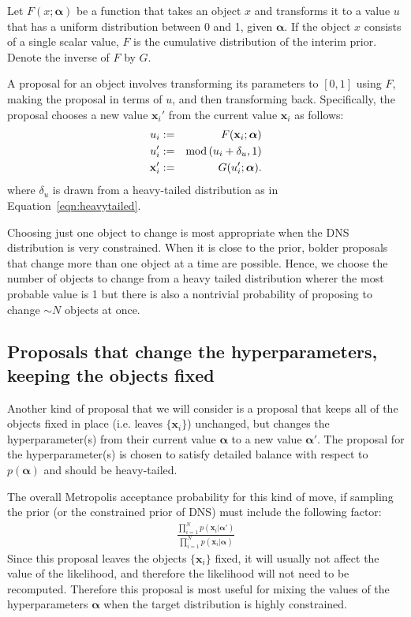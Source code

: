 \documentclass[letterpaper, 11pt]{article}
\newcommand{\hyperparams}{\boldsymbol{\alpha}}
\newcommand{\xx}{\mathbf{x}}
\begin{document}
Let $F(x; \hyperparams)$ be a function that takes an object $x$ and transforms it
to a value $u$ that has a uniform distribution between 0 and 1, given $\hyperparams$.
If the object $x$ consists of a single scalar value, $F$ is the cumulative
distribution of the interim prior. Denote the inverse of $F$ by $G$.

A proposal
for an object involves transforming its parameters to $[0, 1]$ using $F$,
making the proposal in terms of $u$, and then transforming back.
Specifically, the proposal chooses
a new value $\xx_i'$ from the current value $\xx_i$ as follows:
\begin{eqnarray}
u_i &:=& F(\xx_i; \hyperparams)\\
u_i' &:=& \textnormal{mod}\left(u_i + \delta_u, 1\right)\\
\xx_i' &:=& G(u_i'; \hyperparams).
\end{eqnarray}
where $\delta_u$ is drawn from a heavy-tailed distribution as in
Equation~\ref{eqn:heavytailed}.

Choosing just one object to change is most appropriate when the DNS
distribution is very constrained. When it is close to the prior, bolder
proposals that change more than one object at a time are possible. Hence,
we choose the number of objects to change from a heavy tailed distribution
wherer the most probable value is 1 but there is also a nontrivial probability
of proposing to change $\sim N$ objects at once.

\subsection{Proposals that change the hyperparameters,
keeping the objects fixed}\label{sec:proposal3}
Another kind of proposal that we will consider is a proposal that keeps all of
the objects fixed in place (i.e. leaves $\{\xx_i\}$) unchanged, but changes
the hyperparameter(s) from their current value $\hyperparams$
to a new value $\hyperparams'$. The proposal for the hyperparameter(s) is chosen
to satisfy detailed balance with respect to $p(\hyperparams)$ and should be
heavy-tailed.

The overall Metropolis acceptance probability
for this kind of move, if sampling the prior (or the constrained prior of DNS)
must include the following factor:
\begin{eqnarray}
\frac{\prod_{i=1}^N p(\xx_i | \hyperparams')}{\prod_{i=1}^N p(\xx_i | \hyperparams)}
\label{eqn:acceptance_prob}
\end{eqnarray}
Since this proposal leaves the objects $\{\xx_i\}$ fixed, it will usually not
affect the value of the likelihood, and therefore the likelihood will not need
to be recomputed. Therefore this proposal is most useful for mixing the values
of the hyperparameters $\hyperparams$ when the target distribution is highly
constrained.
\end{document}
